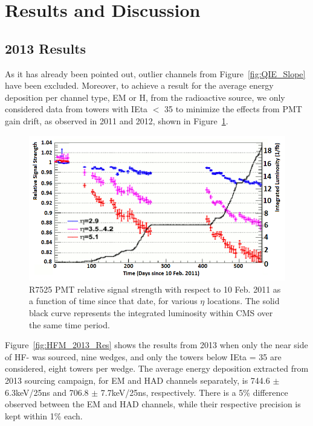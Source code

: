 \section{Results and Discussion}
\subsection{2013 Results}
As it has already been pointed out, outlier channels from Figure~\ref{fig:QIE_Slope} have been excluded.
Moreover, to achieve a result for the average energy deposition per channel type,
EM or H, from the radioactive source, we only considered data from towers with
IEta $<$ 35 to minimize the effects from PMT gain drift, as observed in 2011 and
2012, shown in Figure~\ref{fig:PMT_Drift}.

\begin{figure}[htb]
   \begin{center}
      \includegraphics[width=.75\textwidth]{figures/ch_hfcalibration/PMT_Drift.png}
      \caption{R7525 PMT relative signal strength with respect to 10 Feb. 2011 as a
      function of time since that date, for various $\eta$ locations. The solid
      black curve represents the integrated luminosity within CMS over the same
      time period.}
      \label{fig:PMT_Drift}
   \end{center}
\end{figure}

Figure~\ref{fig:HFM_2013_Res} shows the results from 2013 when only the near side
of HF- was sourced, nine wedges, and only the towers below IEta = 35 are
considered, eight towers per wedge. The average energy deposition extracted from
2013 sourcing campaign, for EM and HAD channels separately, is 744.6 $\pm$ 6.3\unit{keV}/25\unit{ns} and 706.8 $\pm$ 7.7\unit{keV}/25\unit{ns}, respectively. There
is a 5\% difference observed between the EM and HAD channels, while their
respective precision is kept within 1\% each.


